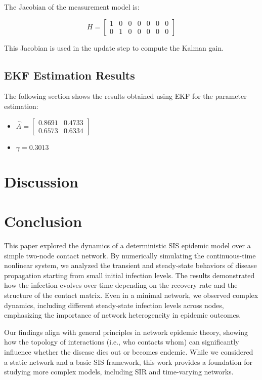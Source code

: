 \documentclass[a4paper,10pt]{report}
\begin{document}
The Jacobian of the measurement model is:

\[
H = \begin{bmatrix} 1 & 0 & 0 & 0 & 0 & 0 & 0 \\ 0 & 1 & 0 & 0 & 0 & 0 & 0 \end{bmatrix}
\]

This Jacobian is used in the update step to compute the Kalman gain.

\subsection{EKF Estimation Results}
The following section shows the results obtained using EKF for the parameter estimation: 
\begin{itemize}
\item \( \hat{A} = \begin{bmatrix}  0.8691 & 0.4733 \\ 0.6573 &  0.6334\end{bmatrix} \) 
\item \( \gamma = 0.3013 \)
\end{itemize}
\section{Discussion}


\section{Conclusion}

This paper explored the dynamics of a deterministic SIS epidemic model over a simple two-node contact network. By numerically simulating the continuous-time nonlinear system, we analyzed the transient and steady-state behaviors of disease propagation starting from small initial infection levels. The results demonstrated how the infection evolves over time depending on the recovery rate and the structure of the contact matrix. Even in a minimal network, we observed complex dynamics, including different steady-state infection levels across nodes, emphasizing the importance of network heterogeneity in epidemic outcomes.

Our findings align with general principles in network epidemic theory, showing how the topology of interactions (i.e., who contacts whom) can significantly influence whether the disease dies out or becomes endemic. While we considered a static network and a basic SIS framework, this work provides a foundation for studying more complex models, including SIR and time-varying networks.
\end{document}
